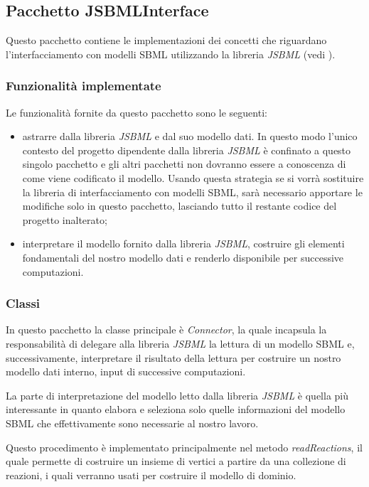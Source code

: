 \subsection{Pacchetto JSBMLInterface}
\label{subsection:JSbmlInterface-package-description}
Questo pacchetto contiene le implementazioni dei concetti che
riguardano l'interfacciamento con modelli SBML utilizzando la libreria
\emph{JSBML} (vedi \cite{JSbmlDistribution}).

\subsubsection*{Funzionalit\`a implementate}

Le funzionalit\`a fornite da questo pacchetto sono le seguenti:
\begin{itemize}
\item astrarre dalla libreria \emph{JSBML} e dal suo modello dati. In
  questo modo l'unico contesto del progetto dipendente dalla libreria
  \emph{JSBML} \`e confinato a questo singolo pacchetto e gli altri
  pacchetti non dovranno essere a conoscenza di come viene codificato
  il modello. Usando questa strategia se si vorr\`a sostituire la
  libreria di interfacciamento con modelli SBML, sar\`a necessario
  apportare le modifiche solo in questo pacchetto, lasciando tutto il
  restante codice del progetto inalterato;
\item interpretare il modello fornito dalla libreria \emph{JSBML},
  costruire gli elementi fondamentali del nostro modello dati e
  renderlo disponibile per successive computazioni.
\end{itemize}

\subsubsection*{Classi}
In questo pacchetto la classe principale \`e \emph{Connector}, la
quale incapsula la responsabilit\`a di delegare alla libreria
\emph{JSBML} la lettura di un modello SBML e, successivamente,
interpretare il risultato della lettura per costruire un nostro
modello dati interno, input di successive computazioni.

La parte di interpretazione del modello letto dalla libreria
\emph{JSBML} \`e quella pi\`u interessante in quanto elabora e
seleziona solo quelle informazioni del modello SBML che effettivamente
sono necessarie al nostro lavoro.

Questo procedimento \`e implementato principalmente nel metodo
\emph{readReactions}, il quale permette di costruire un insieme di
vertici a partire da una collezione di reazioni, i quali verranno
usati per costruire il modello di dominio.
